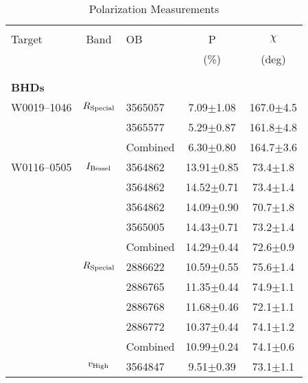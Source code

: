 \begin{table}
    \caption{\label{tab:pols} Polarization Measurements}
    \begin{tabular}{lclcc}
        \hline \hline\\
        Target & Band & OB &  P   & $\chi$ \\
               &      &    & (\%) &  (deg) \\
        \\
        \hline\\
        {\bf{BHDs}}\\
        W0019--1046  & $R_{\rm Special}$ & 3565057   & \phantom{0}7.09$\pm$1.08 &           167.0$\pm$4.5 \\
                     &                   & 3565577   & \phantom{0}5.29$\pm$0.87 &           161.8$\pm$4.8 \\
                     &                   & Combined  & \phantom{0}6.30$\pm$0.80 &           164.7$\pm$3.6 \\
        W0116--0505  & $I_{\rm Bessel}$  & 3564862   &           13.91$\pm$0.85 & \phantom{0}73.4$\pm$1.8 \\
                     &                   & 3564862   &           14.52$\pm$0.71 & \phantom{0}73.4$\pm$1.4 \\
                     &                   & 3564862   &           14.09$\pm$0.90 & \phantom{0}70.7$\pm$1.8 \\
                     &                   & 3565005   &           14.43$\pm$0.71 & \phantom{0}73.2$\pm$1.4 \\
                     &                   & Combined  &           14.29$\pm$0.44 & \phantom{0}72.6$\pm$0.9 \\
                     & $R_{\rm Special}$ & 2886622   &           10.59$\pm$0.55 & \phantom{0}75.6$\pm$1.4 \\
                     &                   & 2886765   &           11.35$\pm$0.44 & \phantom{0}74.9$\pm$1.1 \\
                     &                   & 2886768   &           11.68$\pm$0.46 & \phantom{0}72.1$\pm$1.1 \\
                     &                   & 2886772   &           10.37$\pm$0.44 & \phantom{0}74.1$\pm$1.2 \\
                     &                   & Combined  &           10.99$\pm$0.24 & \phantom{0}74.1$\pm$0.6 \\
                     & $v_{\rm High}$    & 3564847   & \phantom{0}9.51$\pm$0.39 & \phantom{0}73.1$\pm$1.1 \\

\end{tabular}
\end{table}
